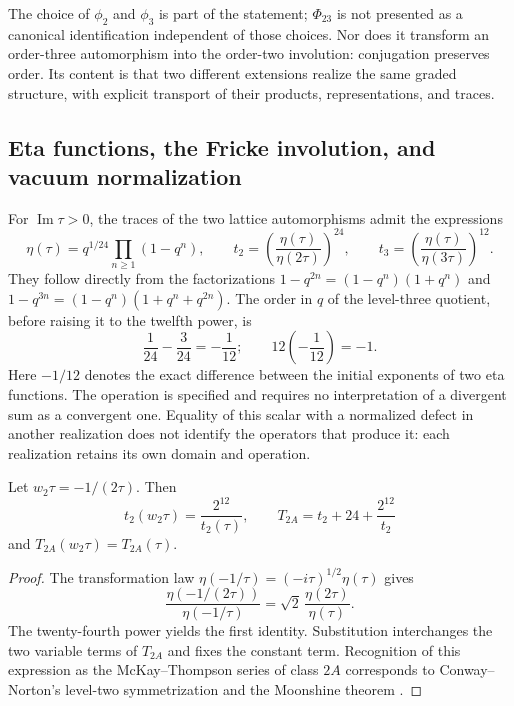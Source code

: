 The choice of \(\phi_2\) and \(\phi_3\) is part of the statement;
\(\Phi_{23}\) is not presented as a canonical identification
independent of those choices. Nor does it transform an order-three
automorphism into the order-two involution: conjugation preserves order.
Its content is that two different extensions realize the same graded
structure, with explicit transport of their products, representations,
and traces.

\subsection{Eta functions, the Fricke involution, and vacuum normalization}
\label{km:fricke}

For \(\operatorname{Im}\tau>0\), the traces of the two lattice
automorphisms admit the expressions
\begin{equation}
 \eta(\tau)=q^{1/24}\prod_{n\ge1}(1-q^n),\qquad
 t_2=\left(\frac{\eta(\tau)}{\eta(2\tau)}\right)^{24},\qquad
 t_3=\left(\frac{\eta(\tau)}{\eta(3\tau)}\right)^{12}.
 \label{km:eta-trazas}
\end{equation}
They follow directly from the factorizations
\(1-q^{2n}=(1-q^n)(1+q^n)\) and
\(1-q^{3n}=(1-q^n)(1+q^n+q^{2n})\). The order in \(q\) of the
level-three quotient, before raising it to the twelfth power, is
\[
 \frac1{24}-\frac3{24}=-\frac1{12};
 \qquad 12\left(-\frac1{12}\right)=-1.
\]
Here \(-1/12\) denotes the exact difference between the initial
exponents of two eta functions. The operation is specified and requires
no interpretation of a divergent sum as a convergent one.
Equality of this scalar with a normalized defect in another realization
does not identify the operators that produce it: each realization
retains its own domain and operation.

\begin{proposition}
\label{km:fricke-prop}
Let \(w_2\tau=-1/(2\tau)\). Then
\begin{equation}
 t_2(w_2\tau)=\frac{2^{12}}{t_2(\tau)},\qquad
 T_{2A}=t_2+24+\frac{2^{12}}{t_2}
 \label{km:fricke-t2}
\end{equation}
and \(T_{2A}(w_2\tau)=T_{2A}(\tau)\).
\end{proposition}
\begin{proof}
The transformation law
\(\eta(-1/\tau)=(-i\tau)^{1/2}\eta(\tau)\) gives
\[
 \frac{\eta(-1/(2\tau))}{\eta(-1/\tau)}
 =\sqrt2\,\frac{\eta(2\tau)}{\eta(\tau)}.
\]
The twenty-fourth power yields the first identity. Substitution
interchanges the two variable terms of \(T_{2A}\) and fixes the
constant term. Recognition of this expression as the McKay--Thompson
series of class \(2A\) corresponds to Conway--Norton's level-two
symmetrization
\cite[\S\S4 and 6, Table~3]{kmconwaynorton1979} and the
Moonshine theorem \cite{borcherds}.
\end{proof}

